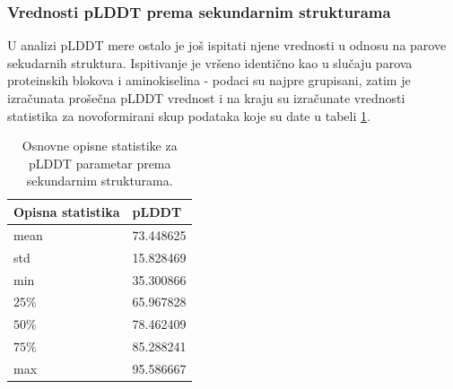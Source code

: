 \documentclass[a4paper,12pt]{article}
\begin{document}
\subsubsection{Vrednosti pLDDT prema sekundarnim strukturama}
U analizi pLDDT mere ostalo je još ispitati njene vrednosti u odnosu na parove sekudarnih struktura. Ispitivanje je vršeno identično kao u slučaju parova proteinskih blokova i aminokiselina - podaci su najpre grupisani, zatim je izračunata prošečna pLDDT vrednost i na kraju su izračunate vrednosti statistika za novoformirani skup podataka koje su date u tabeli \ref{Tabela:8}.
\begin{table}[h!]
    \centering
    \begin{tabular}{ |l|l| } 
    \hline
    \textbf{Opisna statistika} & \textbf{pLDDT} \\
    \hline
    mean & 73.448625 \\
    std  & 15.828469 \\
    min  & 35.300866 \\
    $25\%$  & 65.967828 \\
    $50\%$  & 78.462409 	\\
    $75\%$ & 85.288241\\
    max & 95.586667 	\\
    \hline
    \end{tabular}
    \caption{Osnovne opisne statistike za pLDDT parametar prema sekundarnim strukturama.}
    \label{Tabela:8}
\end{table}
\end{document}
